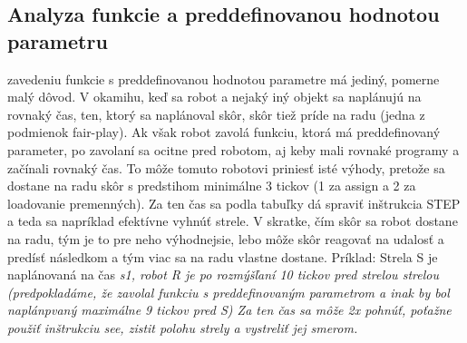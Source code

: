 \subsection{Analyza funkcie a preddefinovanou hodnotou parametru}
zavedeniu funkcie s preddefinovanou hodnotou parametre má jediný, pomerne malý dôvod. V okamihu, keď sa robot a nejaký iný objekt sa naplánujú na rovnaký čas, ten, ktorý sa naplánoval skôr, skôr tiež príde na radu (jedna z podmienok fair-play). Ak však robot zavolá funkciu, ktorá má preddefinovaný parameter, po zavolaní sa ocitne pred robotom, aj keby mali rovnaké programy a začínali rovnaký čas. To môže tomuto robotovi priniesť isté výhody, pretože sa dostane na radu skôr s predstihom minimálne 3 tickov (1 za assign a 2 za loadovanie premenných). Za ten čas sa podla tabuľky dá spraviť inštrukcia STEP a teda sa napríklad efektívne vyhnúť strele. V skratke, čím skôr sa robot dostane na radu, tým je to pre neho výhodnejsie, lebo môže skôr reagovať na udalosť a predísť následkom a tým viac sa na radu vlastne dostane. Príklad: Strela S je naplánovaná na čas \it{s1}, robot R je po rozmýšľaní 10 tickov pred strelou strelou (predpokladáme, že zavolal funkciu s preddefinovaným parametrom a inak by bol naplánpvaný maximálne 9 tickov pred S) Za ten čas sa môže 2x pohnúť, poťažne použiť inštrukciu see, zistit polohu strely a vystreliť jej smerom.
